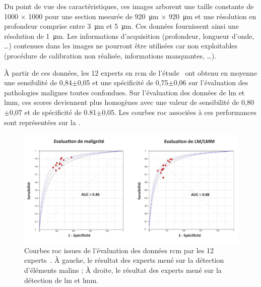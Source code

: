 Du point de vue des caractéristiques, ces images arborent une taille constante de \SI{1000}{\px} $\times$ \SI{1000}{\px} pour une section mesurée de \SI{920}{\micro\metre} $\times$ \SI{920}{\micro\metre} et une résolution en profondeur comprise entre \SI{3}{\micro\metre} et \SI{5}{\micro\metre}. Ces données fournissent ainsi une résolution de \SI{1}{\micro\metre}. Les informations d'acquisition (profondeur, longueur d'onde, \ldots) contenues dans les images ne pourront être utilisées car non exploitables (procédure de calibration non réalisée, informations manquantes, \ldots).\par
\clearpage

À partir de ces données, les 12 experts en \gls{rcm} de l'étude~\cite{Cinotti2018} ont obtenu en moyenne une sensibilité de 0,84$\pm$0,05 et une spécificité de 0,75$\pm$0,06 sur l'évaluation des pathologies malignes toutes confondues. Sur l'évaluation des données de \gls{lm} et \gls{lmm}, ces scores deviennent plus homogènes avec une valeur de sensibilité de 0,80$\pm$0,07 et de spécificité de 0.81$\pm$0,05. Les courbes \gls{roc} associées à ces performances sont représentées sur la .\par

\begin{figure}[H]
    \begin{center}
        \includegraphics[width=\linewidth]{contents/ii_preamble_microscopy/resources/results_roc_rcm_experts.pdf}
        \caption{Courbes \gls{roc} issues de l'évaluation des données \gls{rcm} par les 12 experts~\cite{Cinotti2018}. À gauche, le résultat des experts mené sur la détection d'éléments malins ; À droite, le résultat des experts mené sur la détection de \gls{lm} et \gls{lmm}.}
        \label{fig:results_roc_rcm_experts}
    \end{center} 
\end{figure}\par

